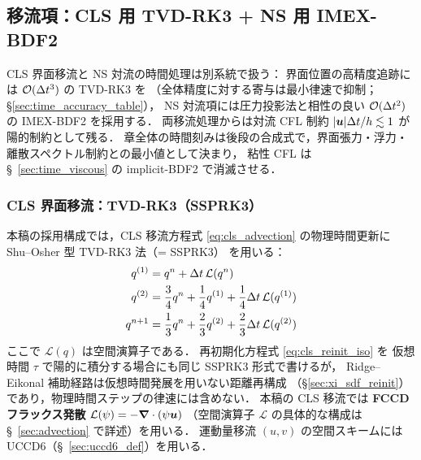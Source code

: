 \subsection{移流項：CLS 用 TVD-RK3 + NS 用 IMEX-BDF2}
\label{sec:time_level1}

CLS 界面移流と NS 対流の時間処理は別系統で扱う：
界面位置の高精度追跡には $\mathcal{O}(\Delta t^3)$ の TVD-RK3 を
（全体精度に対する寄与は最小律速で抑制；\S\ref{sec:time_accuracy_table}），
NS 対流項には圧力投影法と相性の良い $\mathcal{O}(\Delta t^2)$ の IMEX-BDF2 を採用する．
両移流処理からは対流 CFL 制約 $|\bm{u}|\Delta t/h \lesssim 1$ が陽的制約として残る．
章全体の時間刻みは後段の合成式で，界面張力・浮力・離散スペクトル制約との最小値として決まり，
粘性 CFL は §~\ref{sec:time_viscous} の implicit-BDF2 で消滅させる．

\subsubsection*{CLS 界面移流：TVD-RK3（SSPRK3）}

本稿の採用構成では，CLS 移流方程式 \eqref{eq:cls_advection} の物理時間更新に
Shu--Osher 型 TVD-RK3 法（= SSPRK3）\cite{ShuOsher1988} を用いる：
\begin{align}
  q^{(1)} &= q^n + \Delta t \, \mathcal{L}(q^n) \notag\\
  q^{(2)} &= \frac{3}{4}q^n + \frac{1}{4}q^{(1)} + \frac{1}{4}\Delta t\,\mathcal{L}(q^{(1)}) \notag\\
  q^{n+1} &= \frac{1}{3}q^n + \frac{2}{3}q^{(2)} + \frac{2}{3}\Delta t\,\mathcal{L}(q^{(2)})
  \label{eq:tvd_rk3}
\end{align}
ここで $\mathcal{L}(q)$ は空間演算子である．
再初期化方程式 \eqref{eq:cls_reinit_iso} を
仮想時間 $\tau$ で陽的に積分する場合にも同じ SSPRK3 形式で書けるが，
Ridge--Eikonal 補助経路は仮想時間発展を用いない距離再構成
（\S\ref{sec:xi_sdf_reinit}）であり，物理時間ステップの律速には含めない．
本稿の CLS 移流では \textbf{FCCD フラックス発散}
$\mathcal{L}(\psi)=-\bm{\nabla}\cdot(\psi\bm{u})$
（空間演算子 $\mathcal{L}$ の具体的な構成は §~\ref{sec:advection} で詳述）を用いる．
運動量移流 $(u,v)$ の空間スキームには UCCD6（§~\ref{sec:uccd6_def}）を用いる．

